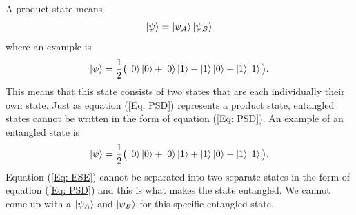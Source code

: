 \documentclass[twocolumn]{article}
\begin{document}
A product state means
\begin{equation}\label{Eq: PSD}
\ket{\psi}=\ket{\psi_A}\ket{\psi_B}
\end{equation}
where an example is
\begin{equation}\label{Eq: PSE}
\ket{\psi}=\frac{1}{2}\big(\ket{0}\ket{0}+\ket{0}\ket{1}-\ket{1}\ket{0}-\ket{1}\ket{1}\big).
\end{equation}
This means that this state consists of two states that are each individually their own state. Just as equation (\ref{Eq: PSD}) represents a product state, entangled states cannot be written in the form of equation (\ref{Eq: PSD}). An example of an entangled state is
\begin{equation}\label{Eq: ESE}
\ket{\psi}=\frac{1}{2}\big(\ket{0}\ket{0}+\ket{0}\ket{1}+\ket{1}\ket{0}-\ket{1}\ket{1}\big).
\end{equation}
Equation (\ref{Eq: ESE}) cannot be separated into two separate states in the form of equation (\ref{Eq: PSD}) and this is what makes the state entangled. We cannot come up with a $\ket{\psi_A}$ and $\ket{\psi_B}$ for this specific entangled state.
\end{document}
